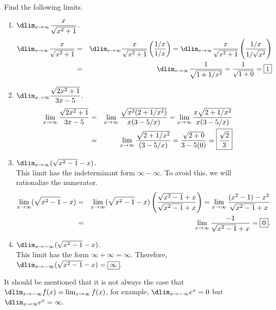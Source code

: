 \documentclass{book}
\begin{document}
\begin{Exam}Find the following limits.
\begin{enumerate}
\item $\dlim_{x\to \infty} \dfrac{x}{\sqrt{x^2+1}}$.
\begin{eqnarray*}
\dlim_{x\to \infty} \dfrac{x}{\sqrt{x^2+1}} &=& \dlim_{x\to \infty} \dfrac{x}{\sqrt{x^2+1}}\left(\dfrac{1/x}{1/x}\right) = \dlim_{x\to \infty} \dfrac{x}{\sqrt{x^2+1}}\left(\dfrac{1/x}{1/\sqrt{x^2}}\right)\\
&=& \dlim_{x\to \infty} \dfrac{1}{\sqrt{1+1/x^2}} = \dfrac{1}{\sqrt{1+0}} = \fbox{$1$}
\end{eqnarray*}

\item  $\dlim_{x\to \infty} \dfrac{\sqrt{2x^2+1}}{3x-5}$.
\begin{eqnarray*}
\lim_{x\to \infty} \dfrac{\sqrt{2x^2+1}}{3x-5} &=& \lim_{x\to \infty} \dfrac{\sqrt{x^2(2+1/x^2)}}{x(3-5/x)} = \lim_{x\to \infty} \dfrac{x\sqrt{2+1/x^2}}{x(3-5/x)}\\
 &=& \lim_{x\to \infty} \dfrac{\sqrt{2+1/x^2}}{(3-5/x)} = \dfrac{\sqrt{2+0}}{3-5(0)} = \fbox{$\dfrac{\sqrt{2}}{3}$}
\end{eqnarray*}

 \item  $\dlim_{x\to \infty} (\sqrt{x^2-1} - x)$.\\
 
 This limit has the indeterminant form $\infty - \infty$. To avoid this, we will rationalize the numerator.
\begin{eqnarray*}
\lim_{x\to \infty} (\sqrt{x^2-1} - x) &=& \lim_{x\to \infty} (\sqrt{x^2-1} - x)\left(\dfrac{\sqrt{x^2-1}+x}{\sqrt{x^2-1}+x}\right) = \lim_{x\to \infty} \dfrac{(x^2-1) - x^2}{\sqrt{x^2-1}+x}\\
&=& \lim_{x\to \infty} \dfrac{-1}{\sqrt{x^2-1}+x} =  \fbox{$0$}. 
\end{eqnarray*}

 \item  $\dlim_{x\to -\infty} (\sqrt{x^2-1} - x)$.\\
 
 This limit has the form $\infty + \infty = \infty$.  Therefore, $\dlim_{x\to -\infty} (\sqrt{x^2-1} - x) = \fbox{$\infty$}. $
\end{enumerate}
\end{Exam}\vs

 It should be mentioned that it is not always the case that $\dlim_{x\to -\infty} f(x) = \lim_{x\to\infty} f(x)$, for example, $\dlim_{x\to -\infty} e^x = 0$ but $\dlim_{x\to \infty} e^x = \infty.$
\end{document}
